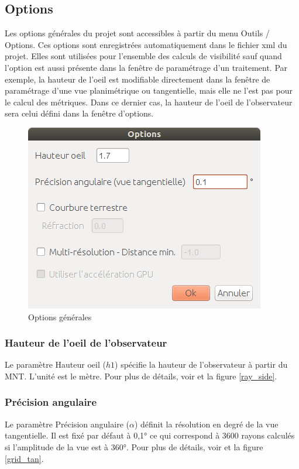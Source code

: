 \documentclass{report}
\begin{document}
\subsection{Options}
\label{options}
Les options générales du projet sont accessibles à partir du menu Outils / Options.
Ces options sont enregistrées automatiquement dans le fichier xml du projet. Elles sont utilisées pour l'ensemble des calculs de visibilité sauf quand l'option est aussi présente dans la fenêtre de paramétrage d'un traitement. Par exemple, la hauteur de l'oeil est modifiable directement dans la fenêtre de paramétrage d'une vue planimétrique ou tangentielle, mais elle ne l'est pas pour le calcul des métriques. Dans ce dernier cas, la hauteur de l'oeil de l'observateur sera celui défini dans la fenêtre d'options.

\begin{figure}[H]
	\includegraphics[scale=0.5]{img/options-fr.png} 
	\caption{Options générales}
\end{figure}

\subsubsection{Hauteur de l'oeil de l'observateur}
Le paramètre Hauteur oeil ($h1$) spécifie la hauteur de l'observateur à partir du MNT. L'unité est le mètre. Pour plus de détails, voir  et la figure \ref{ray_side}.

\subsubsection{Précision angulaire}
Le paramètre Précision angulaire ($\alpha$) définit la résolution en degré de la vue tangentielle. Il est fixé par défaut à 0,1° ce qui correspond à 3600 rayons calculés si l'amplitude de la vue est à 360°. Pour plus de détails, voir  et la figure \ref{grid_tan}. 
\end{document}
